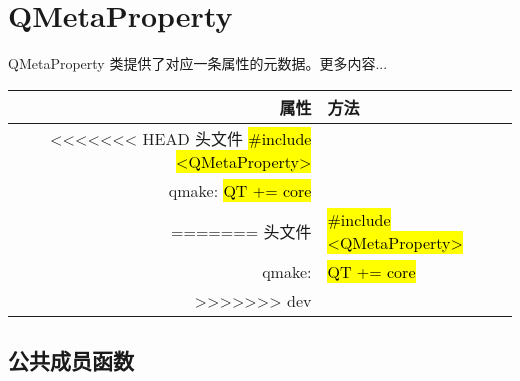 \chapter{QMetaProperty}

QMetaProperty 类提供了对应一条属性的元数据。更多内容...

\begin{tabular}{|r|l|}
	\hline
	属性 & 方法 \\
	\hline
<<<<<<< HEAD
    头文件 	\hl{\#include <QMetaProperty>} \\
    \hline
    qmake: \hl{QT += core}    \\
=======
    头文件  &	\hl{\#include <QMetaProperty>} \\
    \hline
    qmake: & \hl{QT += core}    \\
>>>>>>> dev
	\hline
\end{tabular}

\section{公共成员函数}

